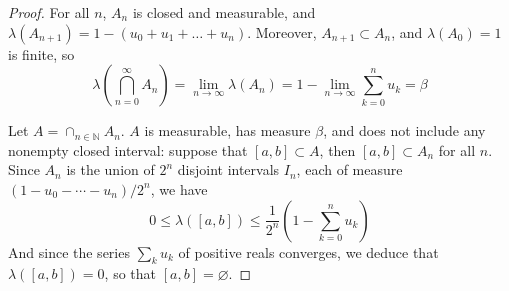 \documentclass[11pt,a4paper,twoside]{article}
\theoremstyle{definition}
\theoremstyle{plain}
\begin{document}
\begin{proof}
  For all $n$, $A_n$ is closed and measurable, and $\lambda ( A_{n + 1} ) = 1 - ( u_0 + u_1 + \dotsc + u_n )$.
  Moreover, $A_{n + 1} \subset A_n$, and $\lambda ( A_0 ) = 1$ is finite, so
  \begin{equation*}
    \lambda \left( \bigcap_{n = 0}^\infty A_n \right) = \lim_{n \to \infty} \lambda ( A_n ) = 1 - \lim_{n \to \infty} \sum_{k = 0}^n u_k = \beta
  \end{equation*}

  Let $A = \cap_{n \in \mathbb{N}} A_n$. $A$ is measurable, has measure $\beta$, and does not include any nonempty closed interval:
  suppose that $[ a, b ] \subset A$, then $[ a, b ] \subset A_n$ for all $n$. Since $A_n$ is the union of $2^n$
  disjoint intervals $I_n$, each of measure $( 1 - u_0 - \dotsb - u_n ) / 2^n$, we have
  \begin{equation*}
    0 \leq \lambda ( [ a, b ] ) \leq \frac{1}{2^n} \left( 1 - \sum_{k = 0}^n u_k \right)
  \end{equation*}
  And since the series $\sum_k u_k$ of positive reals converges, we deduce that $\lambda ( [ a, b ] ) = 0$,
  so that $[ a, b ] = \varnothing$.

\end{proof}
\end{document}
